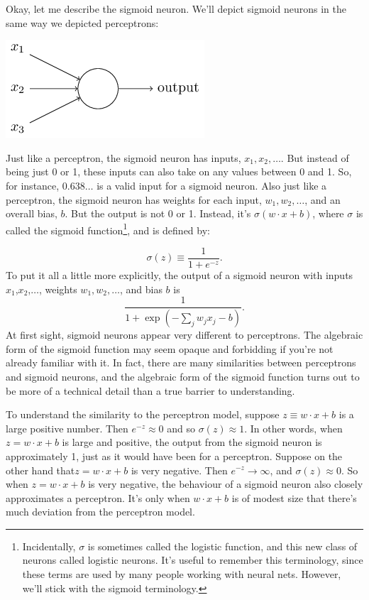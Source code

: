 \documentclass[a4paper,twoside,10pt]{book}
\begin{document}
Okay, let me describe the sigmoid neuron. We'll depict sigmoid neurons in the same way we depicted perceptrons:
\begin{center}
	\includegraphics[scale=0.5]{./figures/ch1/tikz9}
\end{center}	
Just like a perceptron, the sigmoid neuron has inputs, $x_1, x_2, \ldots$. But instead of being just 0 or 1, these inputs can also take on any values between 0 and 1. So, for instance, $0.638\ldots$ is a valid input for a sigmoid neuron. Also just like a perceptron, the sigmoid neuron has weights for each input, $w_1,w_2,\ldots$, and an overall bias, $b$. But the output is not 0 or 1. Instead, it's $\sigma(w⋅x+b)$, where $\sigma$ is called the sigmoid function\footnote{Incidentally, $\sigma$ is sometimes called the logistic function, and this new class of neurons called logistic neurons. It's useful to remember this terminology, since these terms are used by many people working with neural nets. However, we'll stick with the sigmoid terminology.}, and is defined by:

\begin{equation}
\sigma(z) \equiv \frac1{1+e^{-z}}.
\label{eq:sigma}
\end{equation}
To put it all a little more explicitly, the output of a sigmoid neuron with inputs $x_1$,$x_2$,$\ldots$, weights $w_1,w_2,\ldots$, and bias $b$ is
\begin{equation}
\frac1{1+\exp\left(-\sum_jw_jx_j-b\right)}
\label{eq:4}.
\end{equation}
At first sight, sigmoid neurons appear very different to perceptrons. The algebraic form of the sigmoid function may seem opaque and forbidding if you're not already familiar with it. In fact, there are many similarities between perceptrons and sigmoid neurons, and the algebraic form of the sigmoid function turns out to be more of a technical detail than a true barrier to understanding.

To understand the similarity to the perceptron model, suppose $z\equiv w\cdot x+b$ is a large positive number. Then $e^{-z}\approx0$ and so $\sigma(z)\approx 1$. In other words, when $z=w\cdot x+b$ is large and positive, the output from the sigmoid neuron is approximately 1, just as it would have been for a perceptron. Suppose on the other hand that$z=w\cdot x+b$ is very negative. Then $e^{-z}\to\infty$, and $\sigma(z)\approx0$. So when $z=w\cdot x+b$ is very negative, the behaviour of a sigmoid neuron also closely approximates a perceptron. It's only when $w\cdot x+b$ is of modest size that there's much deviation from the perceptron model.
\end{document}
